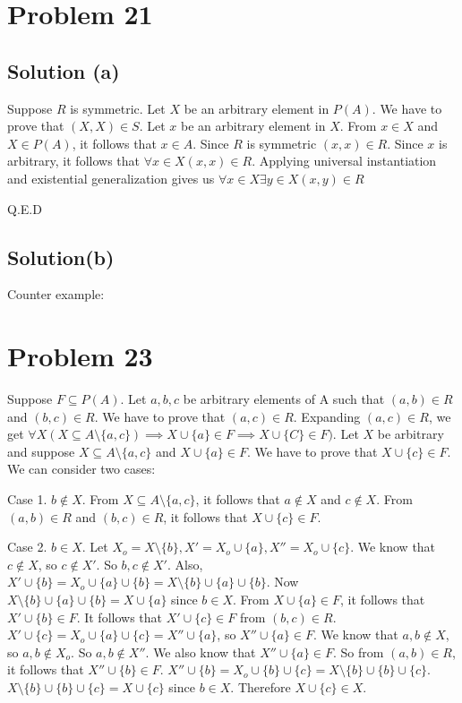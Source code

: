 \documentclass{article}
\begin{document}
\section{Problem 21}

\subsection{Solution (a)}

Suppose $R$ is symmetric. Let $X$ be an arbitrary element in $P(A)$.
We have to prove that $(X,X) \in S$. Let $x$ be an arbitrary element
in $X$. From $x \in X$ and $X \in P(A)$, it follows that $x \in A$.
Since $R$ is symmetric $(x,x) \in R$. Since $x$ is arbitrary, it
follows that $\forall x \in X (x,x) \in R$. Applying universal
instantiation and existential generalization gives us $\forall x \in X
\exists y \in X(x,y) \in R$

Q.E.D

\subsection{Solution(b)}

Counter example: 



\section{Problem 23}
Suppose $F \subseteq P(A)$. Let $a,b,c$ be arbitrary elements of A
such that $(a,b) \in R$ and $(b,c) \in R$. We have to prove that
$(a,c) \in R$. Expanding $(a,c) \in R$, we get $\forall X(X \subseteq
A \setminus \{a,c\}) \implies X \cup \{a\} \in F \implies X \cup \{C\}
\in F)$. Let $X$ be arbitrary and suppose $X \subseteq A \setminus
\{a,c\}$ and $X \cup \{a\} \in F$. We have to prove that $X \cup \{c\}
\in F$. We can consider two cases:

Case 1. $b \notin X$. From $X \subseteq A \setminus \{a,c\}$, it
follows that $a \notin X$ and $c \notin X$. From $(a,b) \in R$ and
$(b,c) \in R$, it follows that $X \cup \{c\} \in F$.

Case 2. $b \in X$. Let $X_o = X \setminus \{b\}, X' = X_o \cup \{a\},
X'' = X_o \cup \{c\}$. We know that $c \notin X$, so $c \notin X'$. So
$b,c \notin X'$. Also, $X' \cup \{b\} = X_o \cup \{a\} \cup \{b\} = X
\setminus \{b\} \cup \{a\} \cup \{b\}$. Now $X \setminus \{b\} \cup
\{a\} \cup \{b\} = X \cup \{a\} $ since $b \in X$. From $X \cup \{a\}
\in F$, it follows that $X' \cup \{b\} \in F$. It follows that $X'
\cup \{c\} \in F$ from $(b,c) \in R$. $X' \cup \{c\} = X_o \cup \{a\}
\cup \{c\} = X'' \cup \{a\}$, so $X'' \cup \{a\} \in F$. We know that
$a,b \notin X$, so $a,b \notin X_o$. So $a,b \notin X''$. We also know
that $X'' \cup \{a\} \in F$. So from $(a,b) \in R$, it follows that
$X'' \cup \{b\} \in F$. $X'' \cup \{b\} = X_o \cup \{b\} \cup \{c\} =
X \setminus \{b\} \cup \{b\} \cup \{c\}$. $X \setminus \{b\} \cup
\{b\} \cup \{c\} = X \cup \{c\}$ since $b \in X$. Therefore $X \cup
\{c\} \in X$.
\end{document}
